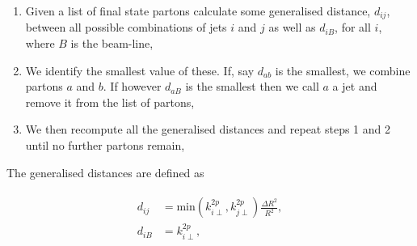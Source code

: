 	\begin{enumerate}
		\item Given a list of final state partons calculate some generalised distance, $d_{ij}$, between all possible
		      combinations of jets $i$ and $j$ as well as $d_{iB}$, for all $i$, where $B$ is the beam-line,
		\item We identify the smallest value of these.  If, say $d_{ab}$ is the smallest, we combine partons $a$ and $b$.
		      If however $d_{aB}$ is the smallest then we call $a$ a jet and remove it from the list of partons,
		\item We then recompute all the generalised distances and repeat steps 1 and 2 until no further partons remain,
	\end{enumerate}

	The generalised distances are defined as

	\begin{align}
	\begin{split}
		d_{ij} &= \text{min}(k_{i\perp}^{2p}, k_{j\perp}^{2p})\frac{\Delta R^2}{R^2},\\
		d_{iB} &= k_{i\perp}^{2p},
		\label{eqn:thiseqn}
	\end{split}
	\end{align}

